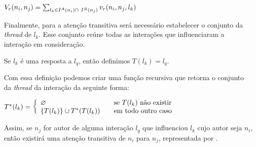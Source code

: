 \begin{Def}
$V_r(n_i, n_j) = \sum_{l_k \in I^A(n_i)\cap~I^R(n_j)}v_r(n_i, n_j, l_k)$
\end{Def}

Finalmente, para a atenção transitiva será necessário estabelecer o conjunto da
\emph{thread} de $l_k$. Esse conjunto reúne todas as interações que influenciaram
a interação em consideração. 

\begin{Def}
Se $l_k$ é uma resposta a $l_q$, então definimos $T(l_k) = l_q$.
\end{Def}

Com essa definição podemos criar uma função recursiva que retorna o conjunto
da \emph{thread} da interação da seguinte forma:

\begin{Def}
$T^*(l_k) = \left\{ \begin{array}{l l} \varnothing &\quad\text{se
$T(l_k)$ não existir}\\ \{T(l_k)\} \cup T^*(T(l_k)) &\quad\text{em
todo outro caso}\end{array} \right.$
\end{Def}

Assim, se $n_j$ for autor de alguma interação $l_q$ que influenciou $l_k$ cujo
autor seja $n_i$, então existirá uma atenção transitiva de $n_i$ para $n_j$,
representada por .

